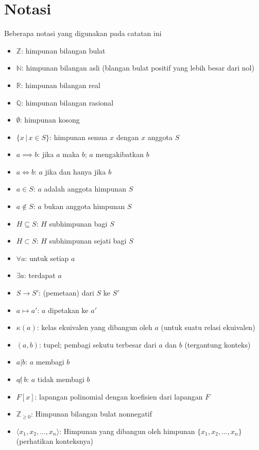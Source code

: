 \chapter{Notasi}
	Beberapa notasi yang digunakan pada catatan ini
	\begin{itemize}
		\item $\mathbb{Z}$: himpunan bilangan bulat
		\item $\mathbb{N}$: himpunan bilangan asli (blangan bulat positif yang lebih besar dari nol)
		\item $\mathbb{R}$: himpunan bilangan real
		\item $\mathbb{Q}$: himpunan bilangan rasional
		\item $\emptyset$: himpunan kosong
		\item $\{x \, | \, x \in S \}$: himpunan semua $x$ dengan $x$ anggota $S$
		\item $a \implies b$: jika $a$ maka $b$; $a$ mengakibatkan $b$
		\item $a \iff b$: $a$ jika dan hanya jika $b$
		\item $a \in S$: $a$ adalah anggota himpunan $S$
		\item $a \notin S$: $a$ bukan anggota himpunan $S$
		\item $H \subseteq S$: $H$ subhimpunan bagi $S$
		\item $H \subset S$: $H$ subhimpunan sejati bagi $S$
		\item $\forall a$: untuk setiap $a$
		\item $\exists a$: terdapat $a$
		\item $S \rightarrow S'$: (pemetaan) dari $S$ ke $S'$
		\item $a \mapsto a'$: $a$ dipetakan ke $a'$
		\item $\kappa(a)$: kelas ekuivalen yang dibangun oleh $a$ (untuk suatu relasi ekuivalen)
		\item $(a,b)$: tupel; pembagi sekutu terbesar dari $a$ dan $b$ (tergantung konteks)
		\item $ a | b$: $a$ membagi $b$
		\item $a \not| \ b$: $a$ tidak membagi $b$
		\item $F[x]$: lapangan polinomial dengan koefisien dari lapangan $F$
		\item $\mathbb{Z}_{\ge 0}$: Himpunan bilangan bulat nonnegatif
		\item $\langle x_1, x_2, ..., x_n \rangle$: Himpunan yang dibangun oleh himpunan  $\{x_1, x_2, ..., x_n\}$ (perhatikan konteksnya)
	\end{itemize}
	